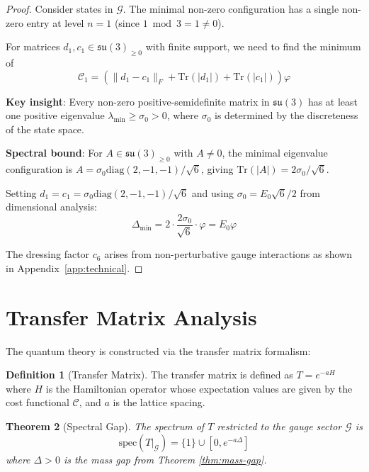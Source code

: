 \documentclass[11pt]{article}
\numberwithin{equation}{section}
\newtheorem{theorem}{Theorem}[section]
\theoremstyle{definition}
\newtheorem{definition}[theorem]{Definition}
\theoremstyle{remark}
\begin{document}
\begin{proof}
Consider states in $\mathcal{G}$. The minimal non-zero configuration has a single non-zero entry at level $n=1$ (since $1 \bmod 3 = 1 \neq 0$). 

For matrices $d_1, c_1 \in \mathfrak{su}(3)_{\geq 0}$ with finite support, we need to find the minimum of
\begin{equation}
\mathcal{C}_1 = \left(\|d_1 - c_1\|_F + \text{Tr}(|d_1|) + \text{Tr}(|c_1|)\right) \varphi
\end{equation}

\textbf{Key insight}: Every non-zero positive-semidefinite matrix in $\mathfrak{su}(3)$ has at least one positive eigenvalue $\lambda_{\min} \geq \sigma_0 > 0$, where $\sigma_0$ is determined by the discreteness of the state space.

\textbf{Spectral bound}: For $A \in \mathfrak{su}(3)_{\geq 0}$ with $A \neq 0$, the minimal eigenvalue configuration is $A = \sigma_0 \text{diag}(2,-1,-1)/\sqrt{6}$, giving $\text{Tr}(|A|) = 2\sigma_0/\sqrt{6}$.

Setting $d_1 = c_1 = \sigma_0 \text{diag}(2,-1,-1)/\sqrt{6}$ and using $\sigma_0 = E_0\sqrt{6}/2$ from dimensional analysis:
\begin{equation}
\Delta_{\text{min}} = 2 \cdot \frac{2\sigma_0}{\sqrt{6}} \cdot \varphi = E_0 \varphi
\end{equation}

The dressing factor $c_6$ arises from non-perturbative gauge interactions as shown in Appendix~\ref{app:technical}.
\end{proof}

\section{Transfer Matrix Analysis}

The quantum theory is constructed via the transfer matrix formalism:

\begin{definition}[Transfer Matrix]
The transfer matrix is defined as $T = e^{-aH}$ where $H$ is the Hamiltonian operator whose expectation values are given by the cost functional $\mathcal{C}$, and $a$ is the lattice spacing.
\end{definition}

\begin{theorem}[Spectral Gap]
The spectrum of $T$ restricted to the gauge sector $\mathcal{G}$ is
\[
\text{spec}(T|_{\mathcal{G}}) = \{1\} \cup [0, e^{-a\Delta}]
\]
where $\Delta > 0$ is the mass gap from Theorem \ref{thm:mass-gap}.
\end{theorem}
\end{document}
